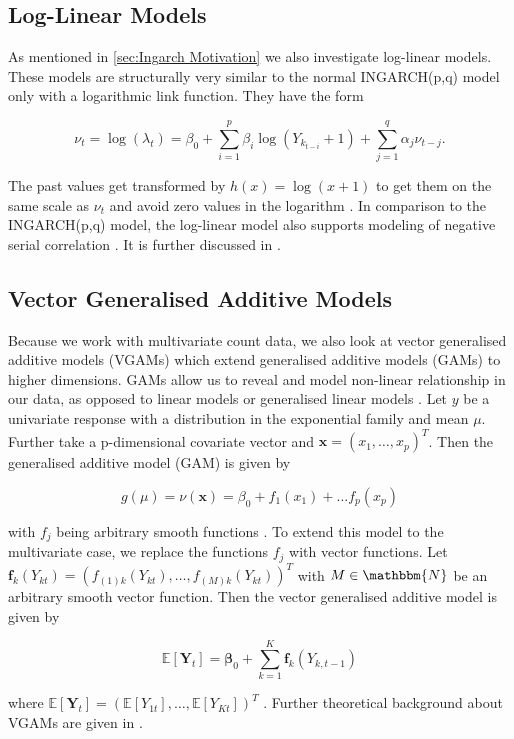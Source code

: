 \subsection{Log-Linear Models}
\label{sec: Log-Linear Models}

As mentioned in \ref{sec:Ingarch Motivation} we also investigate log-linear models. These models are structurally very similar to the normal INGARCH(p,q) model only with a logarithmic link function. They have the form 

\begin{equation}
\nu_t= \log(\lambda_t) = \beta_0 + \sum_{i=1}^p\beta_i \log(Y_{k_{t-i}}+1) + \sum_{j=1}^q\alpha_j \nu_{t-j}.
\label{eq:Log-Linear model}
\end{equation}

The past values get transformed by $h(x)=\log(x+1)$ to get them on the same scale as $\nu_t$ and avoid zero values in the logarithm \cite{Liboschik:2016,Fokianos:2011}. In comparison to the INGARCH(p,q) model, the log-linear model also supports modeling of negative serial correlation \cite{Liboschik:2016}. It is further discussed in \cite{Fokianos:2011,Woodard:2011,Douc:2013}.


\subsection{Vector Generalised Additive Models}
\label{sec:Vgam}

Because we work with multivariate count data, we also look at vector generalised additive models (VGAMs) which extend generalised additive models (GAMs) to higher dimensions. GAMs allow us to reveal and model non-linear relationship in our data, as opposed to linear models or generalised linear models \cite{Yee:1996}. Let $y$ be a univariate response with a distribution in the exponential family and mean $\mu$. Further take a p-dimensional covariate vector and $\bm{x}=(x_1,\ldots,x_p)^T$. Then the generalised additive model (GAM) is given by

\begin{equation}
g(\mu) = \nu(\bm{x}) = \beta_0 + f_1(x_1) + \ldots f_p(x_p)
\label{eq:Gam}
\end{equation}

with $f_j$ being arbitrary smooth functions \cite{Yee:1996}.
To extend this model to the multivariate case, we replace the functions $f_j$ with vector functions. Let $\bm{f}_k(Y_{kt}) = (f_{(1)k}(Y_{kt}),\ldots,f_{(M)k}(Y_{kt}))^T$ with $M \in \mathbbm{N}$ be an arbitrary smooth vector function. Then the vector generalised additive model is given by

\begin{equation}
\mathbb{E}[\bm{Y}_t] = \bm{\beta}_0 + \sum_{k=1}^K\bm{f}_k(Y_{k,t-1})
\label{eq:Vgam}
\end{equation}

where $\mathbb{E}[\bm{Y}_t] = (\mathbb{E}[Y_{1t}],\ldots,\mathbb{E}[Y_{Kt}])^T$ \cite{Yee:1996}. Further theoretical background about VGAMs are given in \cite{Yee:1996,Yee:2015,Wood:2004}.
